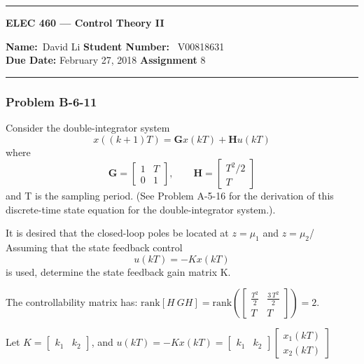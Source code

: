 
\begin{center}
	\hrule
	\vspace{.4cm}
	{\textbf { \large ELEC 460 --- Control Theory II}}
\end{center}
{\textbf{Name:}\ David Li \hspace{\fill} \textbf{Student Number:} \ V00818631  \\}
{\textbf{Due Date:} February 27, 2018 \hspace{\fill} \textbf{Assignment}  8}\\
\hrule
\subsubsection*{Problem B-6-11}
Consider the double-integrator system
\[ x((k+1)T)=\mathbf{G}x(kT)+\mathbf{H}u(kT) \]
where 
\[
\mathbf{G} = \begin{bmatrix} 1 & T \\ 0 & 1 \end{bmatrix}, \qquad
\mathbf{H} = \begin{bmatrix} T^2/2  \\ T \end{bmatrix}
\]
and T is the sampling period. (See Problem A-5-16 for the derivation of this discrete-time state equation for the double-integrator system.). \hfill \linebreak

It is desired that the closed-loop poles be located at $z=\mu_1$ and $z=\mu_2$/ Assuming that the state feedback control
\[
u(kT) = -Kx(kT)
\]
is used, determine the state feedback gain matrix K.

The controllability matrix has: $\text{rank}[H \ GH]=\text{rank}\left(\begin{bmatrix} \frac{T^2}{2} & \frac{3\,T^2}{2}\\ T & T \end{bmatrix}\right)=2$.

Let $K = \begin{bmatrix} k_1 & k_2 \end{bmatrix}$, and $u(kT)=-Kx(kT)= \begin{bmatrix} k_1 & k_2 \end{bmatrix} \begin{bmatrix} x_1(kT) \\ x_2(kT) \end{bmatrix}$ %

